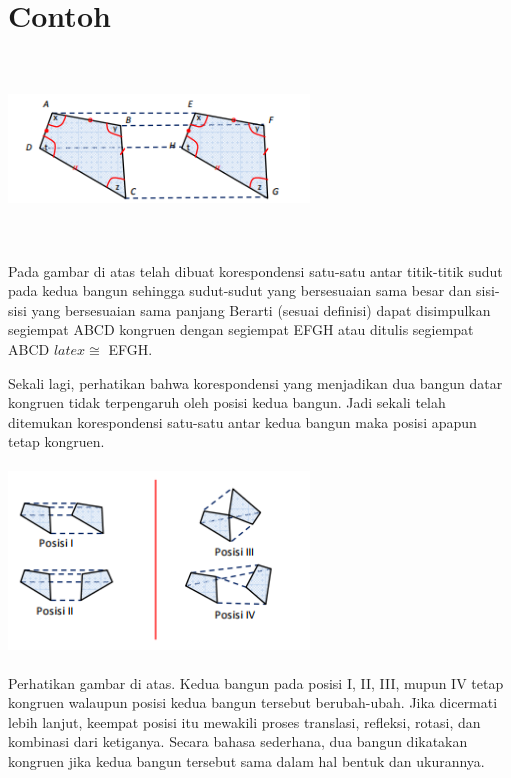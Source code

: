 \documentclass[11pt,fleqn]{book} %
\begin{document}
\section{Contoh}
\includegraphics[width = 8cm, height= 5cm]{Pictures/1.png}
 
Pada gambar di atas telah dibuat korespondensi satu-satu antar titik-titik sudut pada kedua bangun sehingga sudut-sudut yang bersesuaian sama besar dan sisi-sisi yang bersesuaian sama panjang Berarti (sesuai definisi) dapat disimpulkan segiempat
ABCD kongruen dengan segiempat EFGH atau ditulis segiempat ABCD $latex\cong $ EFGH.

Sekali lagi, perhatikan bahwa korespondensi yang menjadikan dua bangun datar kongruen tidak terpengaruh oleh posisi kedua bangun. Jadi sekali telah ditemukan korespondensi satu-satu antar kedua bangun maka posisi apapun tetap kongruen. 

\includegraphics[width = 8cm, height= 5cm]{Pictures/2.png}

Perhatikan gambar di atas. Kedua bangun pada posisi I, II, III, mupun IV tetap
kongruen walaupun posisi kedua bangun tersebut berubah-ubah. Jika dicermati lebih
lanjut, keempat posisi itu mewakili proses translasi, refleksi, rotasi, dan kombinasi
dari ketiganya. Secara bahasa sederhana, dua bangun dikatakan kongruen jika kedua
bangun tersebut sama dalam hal bentuk dan ukurannya. 

\paragraph{}
\end{document}
